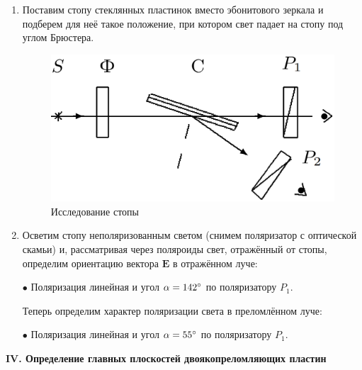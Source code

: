 \documentclass[a4paper,12pt]{article} %
\begin{document}
	\begin{enumerate}
		\item Поставим стопу стеклянных пластинок вместо эбонитового зеркала и подберем для неё такое положение, при котором свет падает на стопу под углом Брюстера.
		
		\begin{figure}[h!]
			\centering
			\includegraphics[scale=0.31]{Pictures/III}
			\caption{Исследование стопы}
		\end{figure}

		\item Осветим стопу неполяризованным светом (снимем поляризатор с оптической скамьи) и, рассматривая через поляроиды свет, отражённый от стопы, определим ориентацию вектора $\boldsymbol{E}$ в отражённом луче:
		
		$\bullet$ Поляризация линейная и угол $\alpha = 142\degree$ по поляризатору $P_1$.
		
		Теперь определим характер поляризации света в преломлённом луче:
		
		$\bullet$ Поляризация линейная и угол $\alpha = 55\degree$ по поляризатору $P_1$.
	\end{enumerate}

	\begin{center}
		\textbf{IV. Определение главных плоскостей двоякопреломляющих пластин}
	\end{center}
\end{document}
